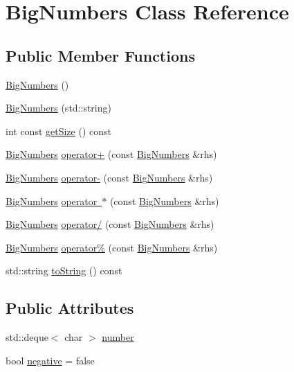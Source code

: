 \hypertarget{classBigNumbers}{}\section{Big\+Numbers Class Reference}
\label{classBigNumbers}
\subsection*{Public Member Functions}
\begin{DoxyCompactItemize}
\item 
\mbox{\hyperlink{classBigNumbers_af3dd82883f10f3473ac83280f26b0ad8}{Big\+Numbers}} ()
\item 
\mbox{\hyperlink{classBigNumbers_a257470bdef0c3db4f7648fe0250e32d6}{Big\+Numbers}} (std\+::string)
\item 
int const \mbox{\hyperlink{classBigNumbers_afe11b1c80e7f6354f99060e874436321}{get\+Size}} () const
\item 
\mbox{\hyperlink{classBigNumbers}{Big\+Numbers}} \mbox{\hyperlink{classBigNumbers_a428fe7dea7f42a6259fd01e825003b95}{operator+}} (const \mbox{\hyperlink{classBigNumbers}{Big\+Numbers}} \&rhs)
\item 
\mbox{\hyperlink{classBigNumbers}{Big\+Numbers}} \mbox{\hyperlink{classBigNumbers_ada0ce248b387911c3dd09550c4c7685e}{operator-\/}} (const \mbox{\hyperlink{classBigNumbers}{Big\+Numbers}} \&rhs)
\item 
\mbox{\hyperlink{classBigNumbers}{Big\+Numbers}} \mbox{\hyperlink{classBigNumbers_a0b859599ec7472fec77e8194d6dd78b5}{operator $\ast$}} (const \mbox{\hyperlink{classBigNumbers}{Big\+Numbers}} \&rhs)
\item 
\mbox{\hyperlink{classBigNumbers}{Big\+Numbers}} \mbox{\hyperlink{classBigNumbers_ab6c457bb8159698ef5d90148249bdf7f}{operator/}} (const \mbox{\hyperlink{classBigNumbers}{Big\+Numbers}} \&rhs)
\item 
\mbox{\hyperlink{classBigNumbers}{Big\+Numbers}} \mbox{\hyperlink{classBigNumbers_a65e9a67a5b527f9b0460599c6f5a59fd}{operator\%}} (const \mbox{\hyperlink{classBigNumbers}{Big\+Numbers}} \&rhs)
\item 
std\+::string \mbox{\hyperlink{classBigNumbers_a5aacfc41443d41ad84d5a5ecafabcc4e}{to\+String}} () const
\end{DoxyCompactItemize}
\subsection*{Public Attributes}
\begin{DoxyCompactItemize}
\item 
std\+::deque$<$ char $>$ \mbox{\hyperlink{classBigNumbers_a6c8e1ed85850facebe4786c667166a8d}{number}}
\item 
bool \mbox{\hyperlink{classBigNumbers_afbdf195b03dfad2a7d9f4938de3c1d3f}{negative}} = false
\end{DoxyCompactItemize}
